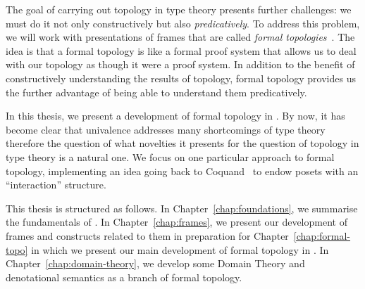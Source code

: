 The goal of carrying out topology in type theory presents further challenges: we must do
it not only constructively but also \emph{predicatively}. To address this problem, we will
work with presentations of frames that are called \emph{formal
topologies}~\cite{int-formal-spaces}. The idea is that a formal topology is like a
formal proof system that allows us to deal with our topology as though it were a proof
system. In addition to the benefit of constructively understanding the results of
topology, formal topology provides us the further advantage of being able to understand
them predicatively.

In this thesis, we present a development of formal topology in \UF{}. By now, it has
become clear that univalence addresses many shortcomings of type theory therefore the
question of what novelties it presents for the question of topology in type theory is a
natural one. We focus on one particular approach to formal topology, implementing an idea
going back to Coquand~\cite{coq-posets} to endow posets with an ``interaction'' structure.

This thesis is structured as follows. In Chapter~\ref{chap:foundations}, we summarise the
fundamentals of \UF{}. In Chapter~\ref{chap:frames}, we present our development of frames
and constructs related to them in preparation for Chapter~\ref{chap:formal-topo} in which
we present our main development of formal topology in \UF{}. In
Chapter~\ref{chap:domain-theory}, we develop some Domain Theory and denotational semantics
as a branch of formal topology.
